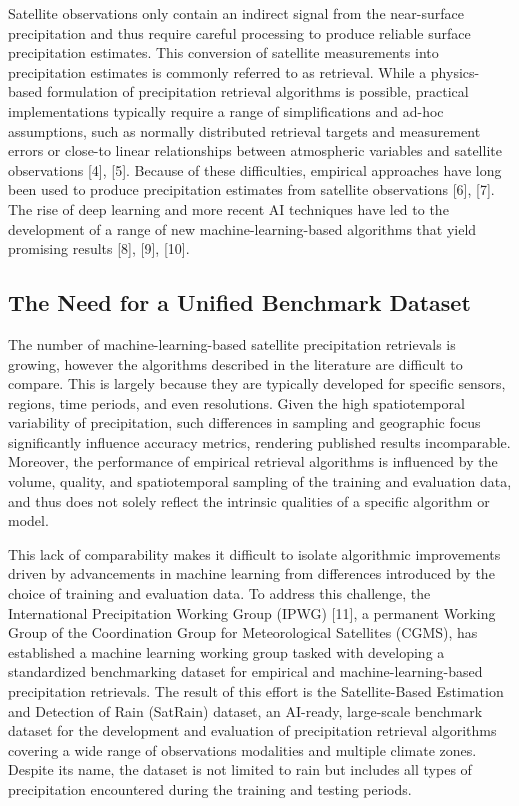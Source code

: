 \documentclass[11pt]{article}
\begin{document}
Satellite observations only contain an indirect signal from the near-surface
precipitation and thus require careful processing to produce reliable surface
precipitation estimates. This conversion of satellite measurements into
precipitation estimates is commonly referred to as retrieval. While a
physics-based formulation of precipitation retrieval algorithms is possible,
practical implementations typically require a range of simplifications and
ad-hoc assumptions, such as normally distributed retrieval targets and
measurement errors or close-to linear relationships between atmospheric
variables and satellite observations [4], [5]. Because of these difficulties,
empirical approaches have long been used to produce precipitation estimates from
satellite observations [6], [7]. The rise of deep learning and more recent AI
techniques have led to the development of a range of new machine-learning-based
algorithms that yield promising results [8], [9], [10].


\subsection{The Need for a Unified Benchmark Dataset}

The number of machine-learning-based satellite precipitation retrievals is
growing, however the algorithms described in the literature are difficult to
compare. This is largely because they are typically developed for specific
sensors, regions, time periods, and even resolutions. Given the high
spatiotemporal variability of precipitation, such differences in sampling and
geographic focus significantly influence accuracy metrics, rendering published
results incomparable. Moreover, the performance of empirical retrieval
algorithms is influenced by the volume, quality, and spatiotemporal sampling of
the training and evaluation data, and thus does not solely reflect the intrinsic
qualities of a specific algorithm or model.

This lack of comparability makes it difficult to isolate algorithmic
improvements driven by advancements in machine learning from differences
introduced by the choice of training and evaluation data. To address this
challenge, the International Precipitation Working Group (IPWG) [11], a
permanent Working Group of the Coordination Group for Meteorological Satellites
(CGMS), has established a machine learning working group tasked with developing
a standardized benchmarking dataset for empirical and machine-learning-based
precipitation retrievals. The result of this effort is the Satellite-Based
Estimation and Detection of Rain (SatRain) dataset, an AI-ready, large-scale
benchmark dataset for the development and evaluation of precipitation retrieval
algorithms covering a wide range of observations modalities and multiple climate
zones. Despite its name, the dataset is not limited to rain but includes all
types of precipitation encountered during the training and testing periods.
\end{document}
